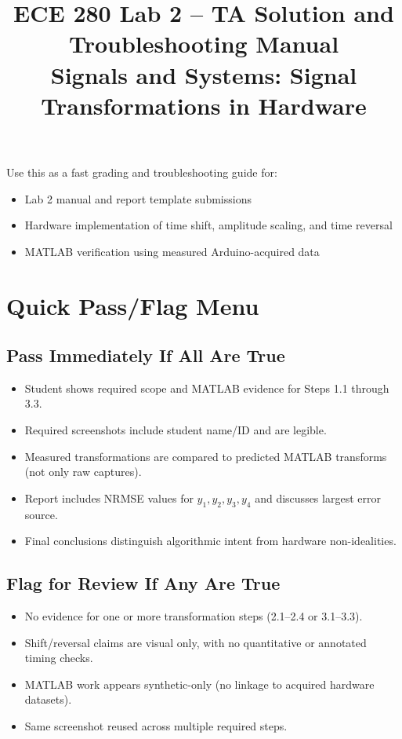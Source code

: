\documentclass[11pt,letterpaper]{article}
\title{ECE 280 Lab 2 -- TA Solution and Troubleshooting Manual\\Signals and Systems: Signal Transformations in Hardware}
\author{}
\date{}
\begin{document}
\maketitle

Use this as a fast grading and troubleshooting guide for:
\begin{itemize}[leftmargin=1.2em]
    \item Lab 2 manual and report template submissions
    \item Hardware implementation of time shift, amplitude scaling, and time reversal
    \item MATLAB verification using measured Arduino-acquired data
\end{itemize}

\section{Quick Pass/Flag Menu}

\subsection*{Pass Immediately If All Are True}
\begin{itemize}[leftmargin=1.2em]
    \item Student shows required scope and MATLAB evidence for Steps 1.1 through 3.3.
    \item Required screenshots include student name/ID and are legible.
    \item Measured transformations are compared to predicted MATLAB transforms (not only raw captures).
    \item Report includes NRMSE values for $y_1,y_2,y_3,y_4$ and discusses largest error source.
    \item Final conclusions distinguish algorithmic intent from hardware non-idealities.
\end{itemize}

\subsection*{Flag for Review If Any Are True}
\begin{itemize}[leftmargin=1.2em]
    \item No evidence for one or more transformation steps (2.1--2.4 or 3.1--3.3).
    \item Shift/reversal claims are visual only, with no quantitative or annotated timing checks.
    \item MATLAB work appears synthetic-only (no linkage to acquired hardware datasets).
    \item Same screenshot reused across multiple required steps.
\end{itemize}
\end{document}
